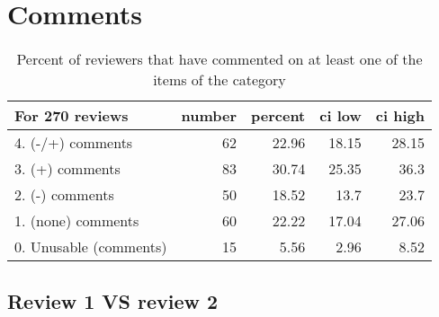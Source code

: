 \documentclass{article}
\begin{document}
\section{Comments} 

\begin{table}[H]

\centering

\begin{tabular}{lrrrr}
\hline
 For 270 reviews        &   number &   percent &   ci low &   ci high \\
\hline
 4. (-/+) comments      &       62 &     22.96 &    18.15 &     28.15 \\
 3. (+) comments        &       83 &     30.74 &    25.35 &     36.3  \\
 2. (-) comments        &       50 &     18.52 &    13.7  &     23.7  \\
 1. (none) comments     &       60 &     22.22 &    17.04 &     27.06 \\
 0. Unusable (comments) &       15 &      5.56 &     2.96 &      8.52 \\
\hline
\end{tabular}\caption{Percent of reviewers that have commented on at least one of the items of the category}

\end{table}



\subsection{Review 1 VS review 2} 
\end{document}

